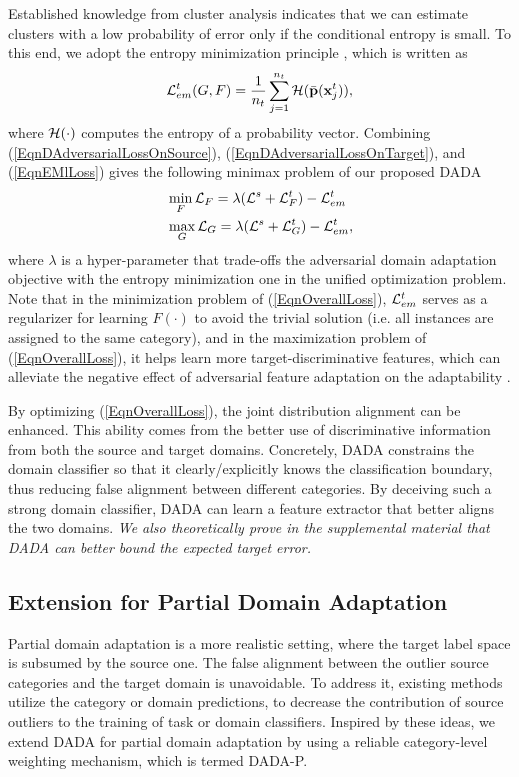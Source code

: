 \documentclass[letterpaper]{article} \usepackage{aaai20}  \usepackage{times}  \usepackage{helvet} \usepackage{courier}  \usepackage[hyphens]{url}  \usepackage{graphicx} \urlstyle{rm} \def\UrlFont{\rm}  \usepackage{graphicx}  \frenchspacing  \setlength{\pdfpagewidth}{8.5in}  \setlength{\pdfpageheight}{11in}
\begin{document}
Established knowledge from cluster analysis \cite{fano_ineq} indicates that we can estimate clusters with a low probability of error only if the conditional entropy is small. To this end, we adopt the entropy minimization principle \cite{em}, which is written as 
\begin{eqnarray}\label{EqnEMlLoss}
{\cal{L}}_{em}^t (G, F) = \frac{1}{n_t} \sum^{n_t}_{j=1} {\cal{H}}(\bar{\mathbf{p}}(\mathbf{x}^t_j)),
\end{eqnarray}
where ${\cal{H}}(\cdot)$ computes the entropy of a probability vector. Combining (\ref{EqnDAdversarialLossOnSource}), (\ref{EqnDAdversarialLossOnTarget}), and (\ref{EqnEMlLoss}) gives the following minimax problem of our proposed DADA 
\begin{eqnarray}\label{EqnOverallLoss}
\begin{aligned}
&\min_{F} {\cal{L}}_F = \lambda ({\cal{L}}^s + {\cal{L}}^t_{F}) - {\cal{L}}_{em}^t \\
&\max_{G} {\cal{L}}_G = \lambda ({\cal{L}}^s + {\cal{L}}^t_{G}) - {\cal{L}}_{em}^t ,
\end{aligned}
\end{eqnarray}
where $\lambda$ is a hyper-parameter that trade-offs the adversarial domain adaptation objective with the entropy minimization one in the unified optimization problem. Note that in the minimization problem of (\ref{EqnOverallLoss}), ${\cal{L}}_{em}^t$ serves as a regularizer for learning $F(\cdot)$ to avoid the trivial solution (i.e. all instances are assigned to the same category), and in the maximization problem of (\ref{EqnOverallLoss}), it helps learn more target-discriminative features, which can alleviate the negative effect of adversarial feature adaptation on the adaptability \cite{tat}.

By optimizing (\ref{EqnOverallLoss}), the joint distribution alignment can be enhanced. This ability comes from the better use of discriminative information from both the source and target domains. Concretely, DADA constrains the domain classifier so that it clearly/explicitly knows the classification boundary, thus reducing false alignment between different categories. By deceiving such a strong domain classifier, DADA can learn a feature extractor that better aligns the two domains. \emph{We also theoretically prove in the supplemental material that DADA can better bound the expected target error.}

\subsection{Extension for Partial Domain Adaptation}
Partial domain adaptation is a more realistic setting, where the target label space is subsumed by the source one. The false alignment between the outlier source categories and the target domain is unavoidable. To address it, existing methods \cite{san,iwan,pada} utilize the category or domain predictions, to decrease the contribution of source outliers to the training of task or domain classifiers. Inspired by these ideas, we extend DADA for partial domain adaptation by using a reliable category-level weighting mechanism, which is termed DADA-P. 
\end{document}
